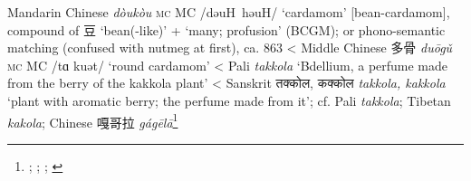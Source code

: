 \begin{etymology}\label{ety:doukou}
Mandarin Chinese {} \textit{dòukòu} \textsc{mc} MC /dəuH həuH/ `cardamom' [bean-cardamom], compound of 豆 `bean(-like)' +  `many; profusion' (BCGM); or phono-semantic matching (confused with nutmeg at first), ca. 863
< Middle Chinese {多骨} \textit{duōgǔ} \textsc{mc} MC /tɑ kuət/ `round cardamom'
< Pali \textit{takkola} `Bdellium, a perfume made from the berry of the kakkola plant'
< Sanskrit {तक्कोल, कक्कोल} \textit{takkola, kakkola} `plant with aromatic berry; the perfume made from it'; cf. Pali \textit{takkola}; Tibetan  \textit{kakola}; Chinese 嘎哥拉 \textit{gágēlā}\footnote{\textcite[22]{donkin_between_2003}; \textcite[18:55]{yyzz}; \textcite[292]{pali_text_society_pali_1921}; \textcite[431, 241]{monier-williams_sanskrit-english_1899}}
\end{etymology}